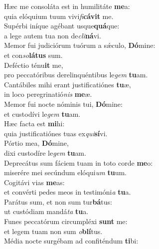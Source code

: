 \evenverse Hæc me consoláta est in humilitáte \textbf{me}a:~\*\\
\evenverse quia elóquium tuum vivi\textit{fi}\textbf{cá}\textbf{vit} me.\\
\oddverse Supérbi iníque agébant usque\textbf{quá}que:~\*\\
\oddverse a lege autem tua non de\textit{cli}\textbf{ná}vi.\\
\evenverse Memor fui judiciórum tuórum a sǽculo, \textbf{Dó}mine:~\*\\
\evenverse et con\textit{so}\textbf{lá}\textbf{tus} sum.\\
\oddverse Deféctio ténu\textbf{it} me,~\*\\
\oddverse pro peccatóribus derelinquéntibus le\textit{gem} \textbf{tu}am.\\
\evenverse Cantábiles mihi erant justificatiónes \textbf{tu}æ,~\*\\
\evenverse in loco peregrinatió\textit{nis} \textbf{me}æ.\\
\oddverse Memor fui nocte nóminis tui, \textbf{Dó}mine:~\*\\
\oddverse et custodívi le\textit{gem} \textbf{tu}am.\\
\evenverse Hæc facta est \textbf{mi}hi:~\*\\
\evenverse quia justificatiónes tuas ex\textit{qui}\textbf{sí}vi.\\
\oddverse Pórtio mea, \textbf{Dó}mine,~\*\\
\oddverse dixi custodíre le\textit{gem} \textbf{tu}am.\\
\evenverse Deprecátus sum fáciem tuam in toto corde \textbf{me}o:~\*\\
\evenverse miserére mei secúndum elóqui\textit{um} \textbf{tu}um.\\
\oddverse Cogitávi vias \textbf{me}as:~\*\\
\oddverse et convérti pedes meos in testimóni\textit{a} \textbf{tu}a.\\
\evenverse Parátus sum, et non sum tur\textbf{bá}tus:~\*\\
\evenverse ut custódiam mandá\textit{ta} \textbf{tu}a.\\
\oddverse Funes peccatórum circumpléxi \textbf{sunt} me:~\*\\
\oddverse et legem tuam non sum \textit{o}\textbf{blí}tus.\\
\evenverse Média nocte surgébam ad confiténdum \textbf{ti}bi:~\*\\
